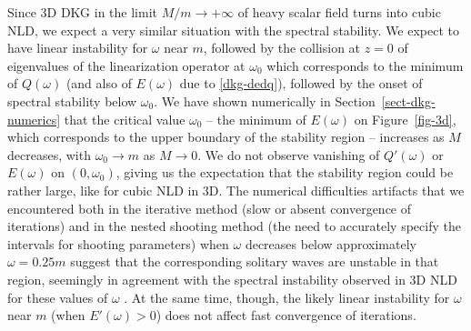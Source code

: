 \documentclass[12pt]{extarticle}
\theoremstyle{plain}
\theoremstyle{remark}
\begin{document}
Since
3D DKG
in the limit $M/m\to+\infty$
of heavy scalar field
turns into cubic NLD,
we expect a very similar situation with the
spectral stability.
We expect to have linear instability
for $\omega$ near $m$, followed by
the collision at $z=0$
of eigenvalues of the linearization operator
at
$\omega_0$ which corresponds to
the minimum of $Q(\omega)$
(and also of $E(\omega)$
due to \eqref{dkg-dedq}), followed by
the onset of spectral stability
below $\omega_0$.
We have shown numerically
in Section~\ref{sect-dkg-numerics}
that
the critical value $\omega_0$
--
the minimum of $E(\omega)$
on Figure~\ref{fig-3d},
which corresponds to
the upper boundary of the stability region -- increases as $M$ decreases, with
$\omega_0\to m$ as $M\to 0$.
We do not observe vanishing of
$Q'(\omega)$ or $E(\omega)$
on $(0,\omega_0)$,
giving us the expectation that the
stability region could be rather
large,
like for
cubic NLD in 3D.
The numerical difficulties artifacts
that we encountered
both in the iterative method
(slow or absent
convergence of iterations)
and in the nested shooting method
(the need to accurately specify
the intervals for shooting parameters)
when $\omega$ decreases below
approximately $\omega=0.25 m$
suggest that the corresponding
solitary waves are unstable
in that region,
seemingly in agreement with the spectral instability observed in 3D NLD for these values of $\omega$ \cite{comech2025stable}.
At the same time,
though,
the likely linear instability for
$\omega$ near $m$
(when $E'(\omega)>0$)
does not affect
fast convergence of iterations.
\end{document}
